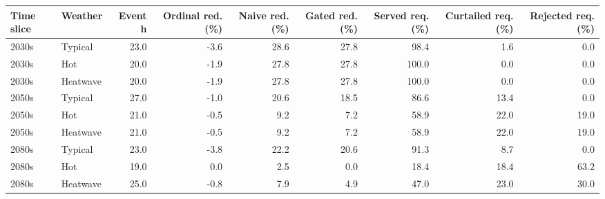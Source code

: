 \begin{tabular}{llrrrrrrr}
\toprule
Time slice & Weather & Event h & Ordinal red. (\%) & Naive red. (\%) & Gated red. (\%) & Served req. (\%) & Curtailed req. (\%) & Rejected req. (\%) \\
\midrule
2030s & Typical & 23.0 & -3.6 & 28.6 & 27.8 & 98.4 & 1.6 & 0.0 \\
2030s & Hot & 20.0 & -1.9 & 27.8 & 27.8 & 100.0 & 0.0 & 0.0 \\
2030s & Heatwave & 20.0 & -1.9 & 27.8 & 27.8 & 100.0 & 0.0 & 0.0 \\
2050s & Typical & 27.0 & -1.0 & 20.6 & 18.5 & 86.6 & 13.4 & 0.0 \\
2050s & Hot & 21.0 & -0.5 & 9.2 & 7.2 & 58.9 & 22.0 & 19.0 \\
2050s & Heatwave & 21.0 & -0.5 & 9.2 & 7.2 & 58.9 & 22.0 & 19.0 \\
2080s & Typical & 23.0 & -3.8 & 22.2 & 20.6 & 91.3 & 8.7 & 0.0 \\
2080s & Hot & 19.0 & 0.0 & 2.5 & 0.0 & 18.4 & 18.4 & 63.2 \\
2080s & Heatwave & 25.0 & -0.8 & 7.9 & 4.9 & 47.0 & 23.0 & 30.0 \\
\bottomrule
\end{tabular}
